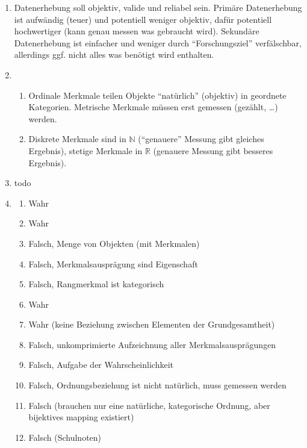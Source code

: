 \documentclass{article}
\begin{document}
\begin{enumerate}
    \item Datenerhebung soll objektiv, valide und reliabel sein. Primäre Datenerhebung ist aufwändig (teuer) und potentiell weniger objektiv, dafür potentiell hochwertiger (kann genau messen was gebraucht wird). Sekundäre Datenerhebung ist einfacher und weniger durch \enquote{Forschungsziel} verfälschbar, allerdings ggf. nicht alles was benötigt wird enthalten.
    
    \item \begin{enumerate}
        \item Ordinale Merkmale teilen Objekte \enquote{natürlich} (objektiv) in geordnete Kategorien. Metrische Merkmale müssen erst gemessen (gezählt, \ldots) werden.
        
        \item Diskrete Merkmale sind in $\mathbb{N}$ (\enquote{genauere} Messung gibt gleiches Ergebnis), stetige Merkmale in $\mathbb{R}$ (genauere Messung gibt besseres Ergebnis).
    \end{enumerate}

    \item todo
    
    \item \begin{multicols}{2}
        \begin{enumerate}
        \item Wahr
        \item Wahr
        \item Falsch, Menge von Objekten (mit Merkmalen)
        \item Falsch, Merkmalsausprägung sind Eigenschaft
        \item Falsch, Rangmerkmal ist kategorisch
        \item Wahr
        \item Wahr (keine Beziehung zwischen Elementen der Grundgesamtheit)
        \item Falsch, unkomprimierte Aufzeichnung aller Merkmalsausprägungen
        \item Falsch, Aufgabe der Wahrscheinlichkeit
        \item Falsch, Ordnungsbeziehung ist nicht natürlich, muss gemessen werden
        \item Falsch (brauchen nur eine natürliche, kategorische Ordnung, aber bijektives mapping existiert)
        \item Falsch (Schulnoten)
    \end{enumerate}
    \end{multicols}


\end{enumerate}
\end{document}
